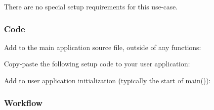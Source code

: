There are no special setup requirements for this use-\/case.\hypertarget{asfdoc_sam0_sercom_usart_basic_use_case_asfdoc_sam0_usart_basic_use_case_setup_code}{}\subsubsection{Code}\label{asfdoc_sam0_sercom_usart_basic_use_case_asfdoc_sam0_usart_basic_use_case_setup_code}
Add to the main application source file, outside of any functions\+: 
\begin{DoxyCodeInclude}{0}
\end{DoxyCodeInclude}
 Copy-\/paste the following setup code to your user application\+: 
\begin{DoxyCodeInclude}{0}
\end{DoxyCodeInclude}
 Add to user application initialization (typically the start of {\ttfamily \mbox{\hyperlink{csc__app_8c_a840291bc02cba5474a4cb46a9b9566fe}{main()}}})\+: 
\begin{DoxyCodeInclude}{0}
\end{DoxyCodeInclude}
 \hypertarget{asfdoc_sam0_sercom_usart_basic_use_case_asfdoc_sam0_usart_basic_use_case_setup_flow}{}\subsubsection{Workflow}\label{asfdoc_sam0_sercom_usart_basic_use_case_asfdoc_sam0_usart_basic_use_case_setup_flow}

